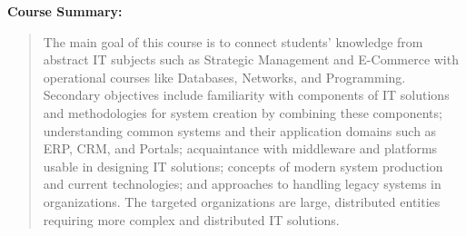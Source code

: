 \documentclass[12pt]{article}
\begin{document}
\textbf{Course Summary:} 
\begin{quote}
   The main goal of this course is to connect students' knowledge from abstract IT subjects such as Strategic Management and E-Commerce with operational courses like Databases, Networks, and Programming. Secondary objectives include familiarity with components of IT solutions and methodologies for system creation by combining these components; understanding common systems and their application domains such as ERP, CRM, and Portals; acquaintance with middleware and platforms usable in designing IT solutions; concepts of modern system production and current technologies; and approaches to handling legacy systems in organizations. The targeted organizations are large, distributed entities requiring more complex and distributed IT solutions.
\end{quote}
\end{document}
